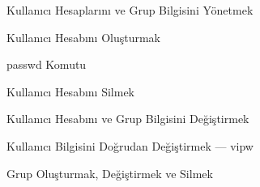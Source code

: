 \begin{section}{Kullanıcı Hesaplarını ve Grup Bilgisini Yönetmek}
\begin{subsection}{Kullanıcı Hesabını Oluşturmak}

\end{subsection}
\begin{subsection}{passwd Komutu}

\end{subsection}
\begin{subsection}{Kullanıcı Hesabını Silmek}

\end{subsection}
\begin{subsection}{Kullanıcı Hesabını ve Grup Bilgisini Değiştirmek}

\end{subsection}
\begin{subsection}{Kullanıcı Bilgisini Doğrudan Değiştirmek --- vipw}

\end{subsection}
\begin{subsection}{Grup Oluşturmak, Değiştirmek ve Silmek}

\end{subsection}

\end{section}